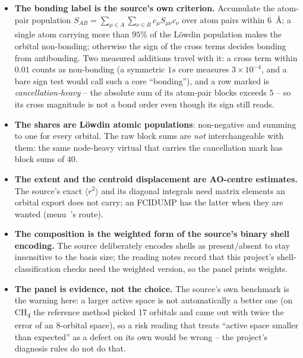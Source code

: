 \begin{readbox}
\begin{itemize}
  \item \textbf{The bonding label is the source's own criterion.}  Accumulate
    the atom-pair population $S_{AB} = \sum_{\mu\in A}\sum_{\nu\in B} c_\mu
    S_{\mu\nu} c_\nu$ over atom pairs within $6$~\AA; a single atom carrying
    more than $95\%$ of the L\"owdin population makes the orbital non-bonding;
    otherwise the sign of the cross terms decides bonding from antibonding.
    Two measured additions travel with it: a cross term within $0.01$ counts as
    non-bonding (a symmetric $1s$ core measures $3\times10^{-4}$, and a bare
    sign test would call such a core ``bonding''), and a row marked \code{!} is
    \emph{cancellation-heavy} -- the absolute sum of its atom-pair blocks
    exceeds $5$ -- so its cross magnitude is not a bond order even though its
    sign still reads.
  \item \textbf{The shares are L\"owdin atomic populations}: non-negative and
    summing to one for every orbital.  The raw block sums are \emph{not}
    interchangeable with them: the same node-heavy virtual that carries the
    cancellation mark has block sums of $40$.
  \item \textbf{The extent and the centroid displacement are AO-centre
    estimates.}  The source's exact $\langle r^2\rangle$ and its diagonal
    integrals need matrix elements an orbital export does not carry; an FCIDUMP
    has the latter when they are wanted (menu~'s route).
  \item \textbf{The composition is the weighted form of the source's binary
    shell encoding.}  The source deliberately encodes shells as present/absent
    to stay insensitive to the basis size; the reading notes record that this
    project's shell-classification checks need the weighted version, so the
    panel prints weights.
  \item \textbf{The panel is evidence, not the choice.}  The source's own
    benchmark is the warning here: a larger active space is not automatically a
    better one (on CH\textsubscript{4} the reference method picked 17 orbitals
    and came out with twice the error of an 8-orbital space), so a risk reading
    that treats ``active space smaller than expected'' as a defect on its own
    would be wrong -- the project's diagnosis rules do not do that.
\end{itemize}
\end{readbox}

